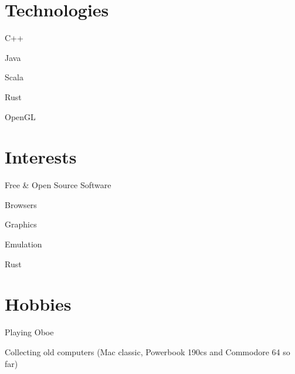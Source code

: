 \documentclass[12pt]{jmichaud-resume}
\begin{document}
	
\begin{minipage}[t]{0.29\textwidth}
\vspace{10pt}

\vspace{22pt}

\section{Technologies}
\vspace{7pt}
\begin{tightemize}
	\item C++
	\item Java
	\item Scala
	\item Rust
	\item OpenGL
\end{tightemize}

\vspace{15pt}

\section{Interests}
\vspace{7pt}
\begin{tightemize}
	\item Free \& Open Source Software
	\item Browsers
	\item Graphics
	\item Emulation
	\item Rust
\end{tightemize}

\vspace{20pt}

\section{Hobbies}
\vspace{7pt}
\begin{tightemize}
	\item Playing Oboe
	\item Collecting old computers (Mac classic, Powerbook 190cs and Commodore 64 so far)
\end{tightemize}


\end{minipage}
\end{document}
